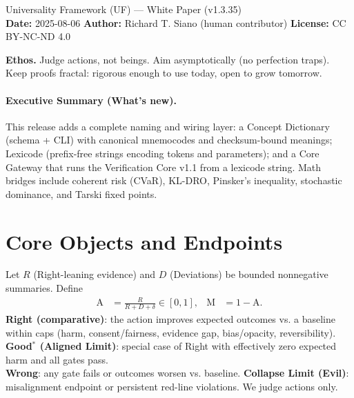 \documentclass[11pt]{article}
\newcommand{\A}{\mathrm{A}}
\newcommand{\M}{\mathrm{M}}
\theoremstyle{plain}
\theoremstyle{definition}
\begin{document}
\begin{center}
{\LARGE Universality Framework (UF) --- White Paper (v1.3.35)}\\[6pt]
\textbf{Date:} 2025-08-06 \quad
\textbf{Author:} Richard T. Siano (human contributor) \quad
\textbf{License:} CC BY-NC-ND 4.0
\end{center}

\noindent\textbf{Ethos.} Judge actions, not beings. Aim asymptotically (no perfection traps). Keep proofs fractal: rigorous enough to use today, open to grow tomorrow.

\paragraph{Executive Summary (What's new).}
This release adds a complete naming and wiring layer: a Concept Dictionary (schema + CLI) with canonical mnemocodes and checksum-bound meanings; Lexicode (prefix-free strings encoding tokens and parameters); and a Core Gateway that runs the Verification Core v1.1 from a lexicode string. Math bridges include coherent risk (CVaR), KL-DRO, Pinsker's inequality, stochastic dominance, and Tarski fixed points.

\tableofcontents

\section{Core Objects and Endpoints}
Let $R$ (Right-leaning evidence) and $D$ (Deviations) be bounded nonnegative summaries. Define
\begin{align}
\A &= \frac{R}{R + D + \delta} \in [0,1], & \M &= 1 - \A.
\end{align}
\textbf{Right (comparative)}: the action improves expected outcomes vs. a baseline within caps (harm, consent/fairness, evidence gap, bias/opacity, reversibility).\\
\textbf{Good$^\ast$ (Aligned Limit)}: special case of Right with effectively zero expected harm and all gates pass.\\
\textbf{Wrong}: any gate fails or outcomes worsen vs. baseline. \textbf{Collapse Limit (Evil)}: misalignment endpoint or persistent red-line violations. We judge actions only.
\end{document}
